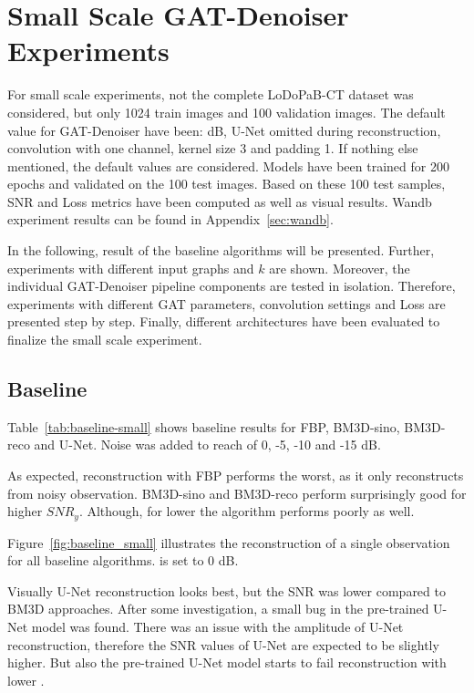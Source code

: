 \section{Small Scale GAT-Denoiser Experiments}
For small scale experiments, not the complete LoDoPaB-CT dataset was considered, but only 1024 train images
and 100 validation images. 
The default value for GAT-Denoiser have been:  dB, U-Net omitted during reconstruction, 
convolution with one channel, kernel size 3 and padding 1. 
If nothing else mentioned, the default values are considered.
Models have been trained for 200 epochs and validated on the 100 test images. Based on these 100 test samples,
SNR and Loss metrics have been computed as well as visual results. 
Wandb experiment results can be found in Appendix~\ref{sec:wandb}.

In the following, result of the baseline algorithms will be presented.
Further, experiments with different input graphs and $k$ are shown. 
Moreover, the individual GAT-Denoiser pipeline components are tested in isolation.
Therefore, experiments with different GAT parameters, convolution settings and Loss are presented step by step.
Finally, different architectures have been evaluated to finalize the small scale experiment.


\subsection{Baseline}

Table~\ref{tab:baseline-small} shows baseline results for FBP, BM3D-sino, BM3D-reco and U-Net.
Noise was added to reach \snry of 0, -5, -10 and -15 dB.

As expected, reconstruction with FBP performs the worst, as it only reconstructs from noisy observation.
BM3D-sino and BM3D-reco perform surprisingly good for higher $\textit{SNR}_y$.
Although, for lower \snry the algorithm performs poorly as well.

Figure~\ref{fig:baseline_small} illustrates the reconstruction of a single
observation for all baseline algorithms. \snry is set to 0 dB.

Visually U-Net reconstruction looks best, but the SNR was lower compared to BM3D approaches.
After some investigation, a small bug in the pre-trained U-Net model was found.
There was an issue with the amplitude of U-Net reconstruction,
therefore the SNR values of U-Net are expected to be slightly higher.
But also the pre-trained U-Net model starts to fail reconstruction with lower \snry.


